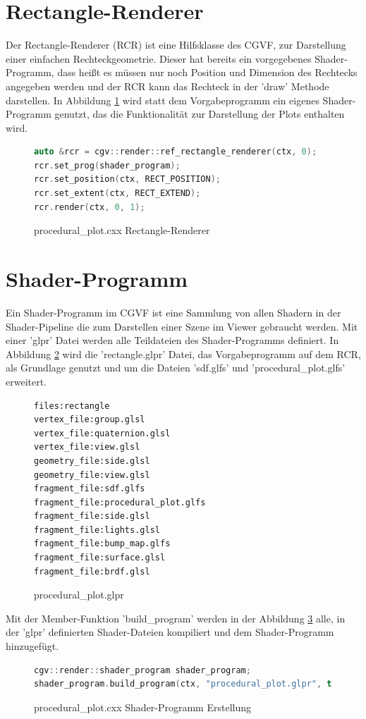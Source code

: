 \section{Rectangle-Renderer}
Der Rectangle-Renderer (RCR) ist eine Hilfsklasse des CGVF, zur Darstellung einer einfachen Rechteckgeometrie.
Dieser hat bereits ein vorgegebenes Shader-Programm, dass heißt es müssen nur noch Position und Dimension des Rechtecks angegeben werden und der RCR kann das Rechteck in der 'draw' Methode darstellen.
In Abbildung \ref{fig:code_rcr} wird statt dem Vorgabeprogramm ein eigenes Shader-Programm genutzt, das die Funktionalität zur Darstellung der Plots enthalten wird.
\begin{figure}[ht]
	\begin{lstlisting}[language=C++]
auto &rcr = cgv::render::ref_rectangle_renderer(ctx, 0);
rcr.set_prog(shader_program);
rcr.set_position(ctx, RECT_POSITION);
rcr.set_extent(ctx, RECT_EXTEND);
rcr.render(ctx, 0, 1);
	\end{lstlisting}
	\caption{procedural\_plot.cxx Rectangle-Renderer}
	\label{fig:code_rcr}
\end{figure}



\section{Shader-Programm}
Ein Shader-Programm im CGVF ist eine Sammlung von allen Shadern in der Shader-Pipeline die zum Darstellen einer Szene im Viewer gebraucht werden.
Mit einer 'glpr' Datei werden alle Teildateien des Shader-Programms definiert.
In Abbildung \ref{fig:code_sp2} wird die 'rectangle.glpr' Datei, das Vorgabeprogramm auf dem RCR, als Grundlage genutzt und um die Dateien 'sdf.glfs' und 'procedural\_plot.glfs' erweitert.
\begin{figure}[ht]
	\begin{lstlisting}
files:rectangle
vertex_file:group.glsl
vertex_file:quaternion.glsl
vertex_file:view.glsl
geometry_file:side.glsl
geometry_file:view.glsl
fragment_file:sdf.glfs
fragment_file:procedural_plot.glfs
fragment_file:side.glsl
fragment_file:lights.glsl
fragment_file:bump_map.glfs
fragment_file:surface.glsl
fragment_file:brdf.glsl
	\end{lstlisting}
	\caption{procedural\_plot.glpr}
	\label{fig:code_sp2}
\end{figure}
\par
Mit der Member-Funktion 'build\_program' werden in der Abbildung \ref{fig:code_sp1} alle, in der 'glpr' definierten Shader-Dateien kompiliert und dem Shader-Programm hinzugefügt.
\begin{figure}[ht]
	\begin{lstlisting}[language=C++]
cgv::render::shader_program shader_program;
shader_program.build_program(ctx, "procedural_plot.glpr", true, defines);
	\end{lstlisting}
	\caption{procedural\_plot.cxx Shader-Programm Erstellung}
	\label{fig:code_sp1}
\end{figure}



